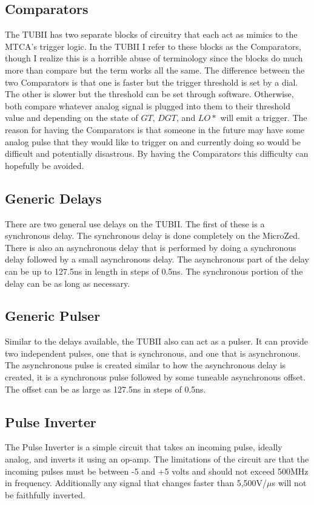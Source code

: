 \documentclass[11pt,a4paper]{article}
\begin{document}
\subsection{Comparators}
The TUBII has two separate blocks of circuitry that each act as mimics to the MTCA's  trigger logic. In the TUBII I refer to these blocks as the Comparators, though I realize this is a horrible abuse of terminology since the blocks do much more than compare but the term works all the same. The difference between the two Comparators is that one is faster but the trigger threshold is set by a dial. The other is slower but the threshold can be set through software. Otherwise, both compare whatever analog signal is plugged into them to their threshold value and depending on the state of $GT$, $DGT$, and $LO*$ will emit a trigger. The reason for having the Comparators is that someone in the future may have some analog pulse that they would like to trigger on and currently doing so would be difficult and potentially disastrous. By having the Comparators this difficulty can hopefully be avoided.
\subsection{Generic Delays}
There are two general use delays on the TUBII. The first of these is a synchronous delay. The synchronous delay is done completely on the MicroZed.  There is also an asynchronous delay that is performed by doing a synchronous delay followed by a small asynchronous delay. The asynchronous part of the delay can be up to 127.5ns in length in steps of 0.5ns. The synchronous portion of the delay can be as long as necessary.
\subsection{Generic Pulser}
Similar to the delays available, the TUBII also can act as a pulser. It can provide two independent pulses, one that is synchronous, and one that is asynchronous. The asynchronous pulse is created similar to how the asynchronous delay is created, it is a synchronous pulse followed by some tuneable asynchronous offset. The offset can be as large as 127.5ns in steps of 0.5ns.
\subsection{Pulse Inverter}
The Pulse Inverter is a simple circuit that takes an incoming pulse, ideally analog, and inverts it using an op-amp. The limitations of the circuit are that the incoming pulses must be between -5 and +5 volts and should not exceed 500MHz in frequency. Additionally any signal that changes faster than 5,500V/$\mu$s will not be faithfully inverted.
\end{document}
